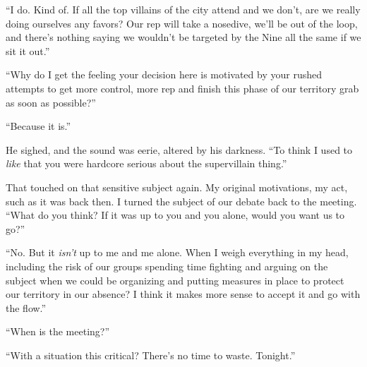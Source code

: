 ``I do.  Kind of.  If all the top villains of the city attend and we don't, are we really doing ourselves any favors?  Our rep will take a nosedive, we'll be out of the loop, and there's nothing saying we wouldn't be targeted by the Nine all the same if we sit it out.''



``Why do I get the feeling your decision here is motivated by your rushed attempts to get more control, more rep and finish this phase of our territory grab as soon as possible?''



``Because it is.''



He sighed, and the sound was eerie, altered by his darkness.  ``To think I used to \emph{like} that you were hardcore serious about the supervillain thing.''



That touched on that sensitive subject again.  My original motivations, my act, such as it was back then.  I turned the subject of our debate back to the meeting.  ``What do you think?  If it was up to you and you alone, would you want us to go?''



``No.  But it \emph{isn't }up to me and me alone.  When I weigh everything in my head, including the risk of our groups spending time fighting and arguing on the subject when we could be organizing and putting measures in place to protect our territory in our absence?  I think it makes more sense to accept it and go with the flow.''



``When is the meeting?''



``With a situation this critical?  There's no time to waste.  Tonight.''





